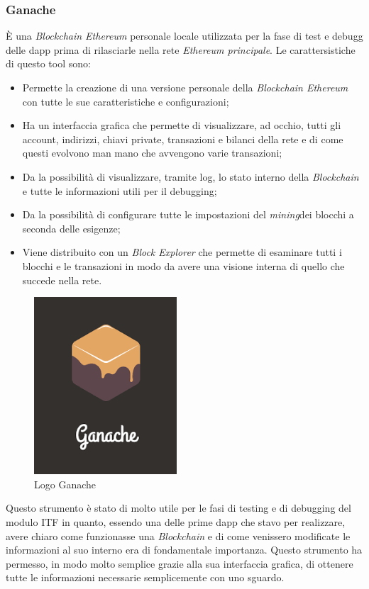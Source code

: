 \subsubsection{Ganache}

È una \textit{Blockchain Ethereum} personale locale utilizzata per la fase di test e debugg delle \gls{dapp} prima di rilasciarle nella rete \textit{Ethereum principale}.
Le carattersistiche di questo tool sono\cite{ganache}:
\begin{itemize}
	\item Permette la creazione di una versione personale della \textit{Blockchain Ethereum} con tutte le sue caratteristiche e configurazioni;
	\item Ha un interfaccia grafica che permette di visualizzare, ad occhio, tutti gli account, indirizzi, chiavi private, transazioni e bilanci della rete e di come questi evolvono man mano che avvengono varie transazioni;
	\item Da la possibilità di visualizzare, tramite log, lo stato interno della \textit{Blockchain} e tutte le informazioni utili per il debugging;
	\item Da la possibilità di configurare tutte le impostazioni del \emph{\gls{mining}}\glsfirstoccur dei blocchi a seconda delle esigenze;
	\item Viene distribuito con un \textit{Block Explorer} che permette di esaminare tutti i blocchi e le transazioni in modo da avere una visione interna di quello che succede nella rete.
\end{itemize}
\begin{figure}[h]
	\centering
	\includegraphics[scale=0.5]{immagini/ganache}
	\caption{Logo Ganache}
\end{figure}
Questo strumento è stato di molto utile per le fasi di testing e di debugging del modulo \gls{ITF} in quanto, essendo una delle prime \gls{dapp} che stavo per realizzare, avere chiaro come funzionasse una \textit{Blockchain} e di come venissero modificate le informazioni al suo interno era di fondamentale importanza. Questo strumento ha permesso, in modo molto semplice grazie alla sua interfaccia grafica, di ottenere tutte le informazioni necessarie semplicemente con uno sguardo.
